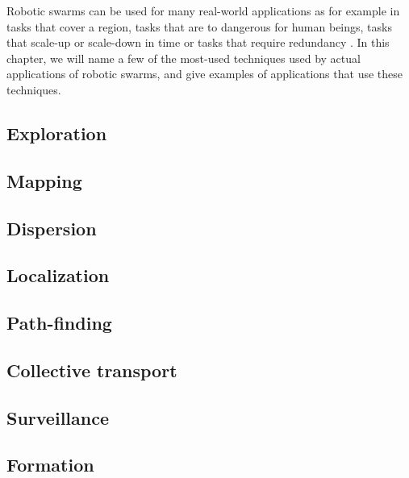 Robotic swarms can be used for many real-world applications as for example in tasks that cover a region, tasks that are to dangerous for human beings, tasks that scale-up or scale-down in time or tasks that require redundancy \cite{csahin2005swarm}. In this chapter, we will name a few of the most-used techniques used by actual applications of robotic swarms, and give examples of applications that use these techniques.

  \subsection{Exploration}
  
  
  \subsection{Mapping}
  
  
  \subsection{Dispersion}
 

  \subsection{Localization}
 

 \subsection{Path-finding}
 

\subsection{Collective transport}


\subsection{Surveillance}


\subsection{Formation}




